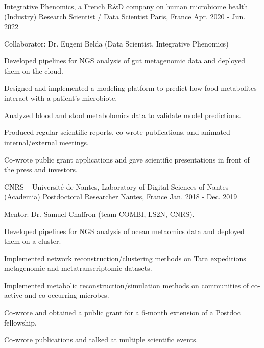 

\begin{cventries}

  \cventry
    {Integrative Phenomics,  a French R\&D company on human microbiome health (Industry)} %
    {Research Scientist / Data Scientist} %
    {Paris, France} %
    {Apr. 2020 - Jun. 2022} %
    {
    Collaborator: Dr. Eugeni Belda (Data Scientist, Integrative Phenomics)
    \vspace{0.5cm}
	\begin{cvitems} %
		\item {Developed pipelines for NGS analysis of gut metagenomic data and deployed them on the cloud.}
		\item {Designed and implemented a modeling platform to predict how food metabolites interact with a patient's microbiote.}
		\item {Analyzed blood and stool metabolomics data to validate model predictions.} 
		\item {Produced regular scientific reports, co-wrote publications, and animated internal/external meetings.}
		\item {Co-wrote public grant applications and gave scientific presentations in front of the press and investors.}
	\end{cvitems}
    }

  \cventry
    {CNRS -- Université de Nantes, Laboratory of Digital Sciences of Nantes (Academia)} %
    {Postdoctoral Researcher} %
    {Nantes, France} %
    {Jan. 2018 - Dec. 2019} %
    {
	Mentor: Dr. Samuel Chaffron (team COMBI, LS2N, CNRS).
    \vspace{0.5cm}
	\begin{cvitems} %
		\item {Developed pipelines for NGS analysis of ocean metaomics data and deployed them on a cluster.}
		\item {Implemented network reconstruction/clustering methods on Tara expeditions metagenomic and metatranscriptomic datasets.}
		\item {Implemented metabolic reconstruction/simulation methods on communities of co-active and co-occurring microbes.}
		\item {Co‑wrote and obtained a public grant for a 6‑month extension of a Postdoc fellowship.}
		\item {Co-wrote publications and talked at multiple scientific events.}
	\end{cvitems}
    }
    

\end{cventries}
